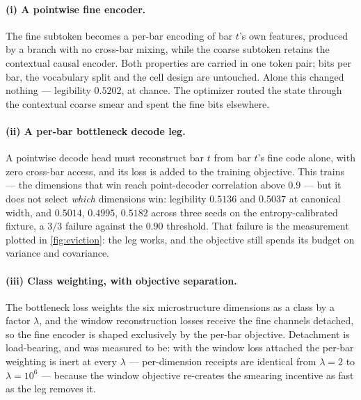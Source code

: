 \paragraph{(i) A pointwise fine encoder.}
The fine subtoken becomes a per-bar encoding of bar $t$'s own features, produced by a branch with
no cross-bar mixing, while the coarse subtoken retains the contextual causal encoder. Both
properties are carried in one token pair; bits per bar, the vocabulary split and the cell design
are untouched.
Alone this changed nothing --- legibility $0.5202$, at chance. The optimizer routed the state
through the contextual coarse smear and spent the fine bits elsewhere.

\paragraph{(ii) A per-bar bottleneck decode leg.}
A pointwise decode head must reconstruct bar $t$ from bar $t$'s fine code alone, with zero cross-bar
access, and its loss is added to the training objective.
This trains --- the dimensions that win reach point-decoder correlation above $0.9$ --- but it does
not select \emph{which} dimensions win: legibility $0.5136$ and $0.5037$ at canonical width, and
$0.5014$, $0.4995$, $0.5182$ across three seeds on the entropy-calibrated fixture, a $3/3$ failure
against the $0.90$ threshold. That failure is the measurement plotted in \cref{fig:eviction}: the
leg works, and the objective still spends its budget on variance and covariance.

\paragraph{(iii) Class weighting, with objective separation.}
The bottleneck loss weights the six microstructure dimensions as a class by a factor $\lambda$, and
the window reconstruction losses receive the fine channels detached, so the fine encoder is shaped
exclusively by the per-bar objective.
Detachment is load-bearing, and was measured to be: with the window loss attached the per-bar
weighting is inert at every $\lambda$ --- per-dimension receipts are identical from $\lambda = 2$
to $\lambda = 10^{6}$ --- because the window objective re-creates the smearing incentive as fast as
the leg removes it.

